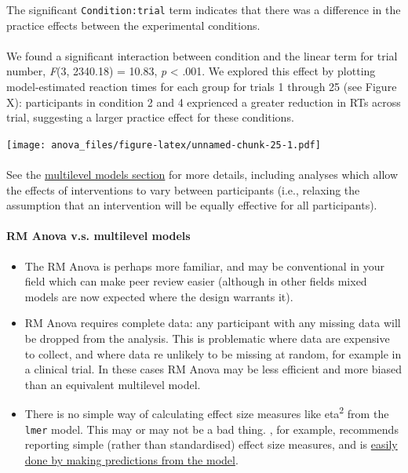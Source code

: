 \documentclass[]{article}
\let\oldparagraph\paragraph
\renewcommand{\paragraph}[1]{\oldparagraph{#1}\mbox{}}
\theoremstyle{definition}
\theoremstyle{definition}
\theoremstyle{definition}
\theoremstyle{remark}
\begin{document}
The significant \texttt{Condition:trial} term indicates that there was a
difference in the practice effects between the experimental conditions.

\paragraph{}\label{section-16}

We found a significant interaction between condition and the linear term
for trial number, \emph{F}(3, 2340.18) = 10.83, \emph{p} \textless{}
.001. We explored this effect by plotting model-estimated reaction times
for each group for trials 1 through 25 (see Figure X): participants in
condition 2 and 4 exprienced a greater reduction in RTs across trial,
suggesting a larger practice effect for these conditions.

\texttt{[image: anova\_files/figure-latex/unnamed-chunk-25-1.pdf]}

\paragraph{}\label{section-17}

See the \protect\hyperlink{multilevel-models}{multilevel models section}
for more details, including analyses which allow the effects of
interventions to vary between participants (i.e., relaxing the
assumption that an intervention will be equally effective for all
participants).

\paragraph{RM Anova v.s. multilevel
models}\label{rm-anova-v.s.-multilevel-models}

\begin{itemize}
\item
  The RM Anova is perhaps more familiar, and may be conventional in your
  field which can make peer review easier (although in other fields
  mixed models are now expected where the design warrants it).
\item
  RM Anova requires complete data: any participant with any missing data
  will be dropped from the analysis. This is problematic where data are
  expensive to collect, and where data re unlikely to be missing at
  random, for example in a clinical trial. In these cases RM Anova may
  be less efficient and more biased than an equivalent multilevel model.
\item
  There is no simple way of calculating effect size measures like
  eta\textsuperscript{2} from the \texttt{lmer} model. This may or may
  not be a bad thing. \citet{baguley2009standardized}, for example,
  recommends reporting simple (rather than standardised) effect size
  measures, and is \protect\hyperlink{predictions-and-margins}{easily
  done by making predictions from the model}.
\end{itemize}
\end{document}
